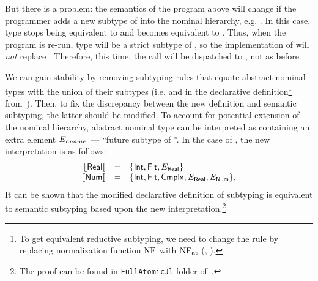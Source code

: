 But there is a problem: %
the semantics of the program above will change
if the programmer adds a new subtype of  
into the nominal hierarchy, e.g. .
In this case, type 
stops being equivalent to 
and becomes equivalent to .
Thus, when the program is re-run, type  
will be a strict subtype of ,
so the implementation of  will \emph{not} replace . 
Therefore, this time, the call  
will be dispatched to , not  as before.

We can gain stability by removing subtyping rules that 
equate abstract nominal types with the union of their subtypes
(i.e.  and  
in the declarative definition\footnote{To get 
	equivalent reductive subtyping, we need to change 
    the  rule by replacing normalization function $\mathop{\mathrm{NF}}$ with $\mathop{\mathrm{NF}_{\mathrm{at}}}$ 
    (, ).}
from~).
Then, to fix the discrepancy between the new definition 
and semantic subtyping, the latter should be modified. 
To account for potential extension of the nominal hierarchy,
abstract nominal type \aname can be interpreted 
as containing an extra element $E_\mathit{aname}$~--- ``future subtype of \aname''.
In the case of \BetaJulia, the new interpretation is as follows:
\[
\begin{array}{rcl}
\llbracket \mathsf{Real} \rrbracket & = & \{ \mathsf{Int}, \mathsf{Flt}, E_{\mathsf{Real}} \} \\
\llbracket \mathsf{Num} \rrbracket & = & \{ \mathsf{Int}, \mathsf{Flt}, \mathsf{Cmplx},
                           E_{\mathsf{Real}}, E_{\mathsf{Num}} \},
\end{array}
\]
It can be shown that
the modified declarative definition of subtyping
is equivalent to semantic subtyping 
based upon the new interpretation.\footnote{The proof can be found 
	in \texttt{FullAtomicJl} folder of~\cite{bib:MiniJlCoq}.}
